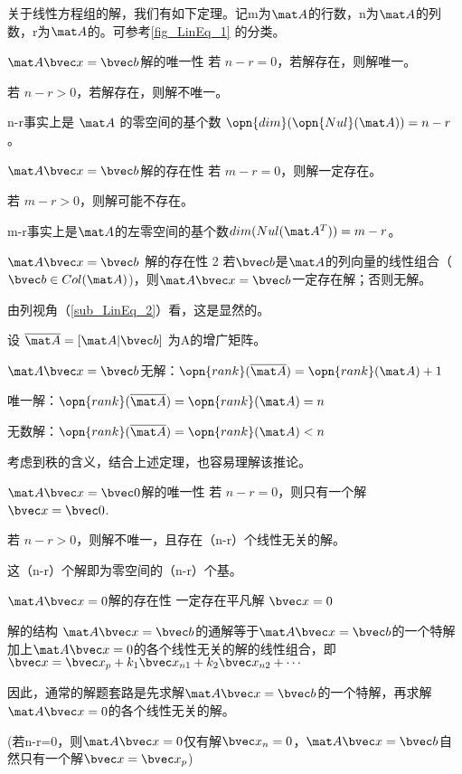 

关于线性方程组的解，我们有如下定理。记m为$\mat A$的行数，n为$\mat A$的列数，r为$\mat A$的。可参考\autoref{fig_LinEq_1} 的分类。

\begin{theorem}{$\mat A \bvec x=\bvec b$解的唯一性}
若 $n-r=0$，若解存在，则解唯一。

若 $n-r>0$，若解存在，则解不唯一。
\end{theorem}
n-r事实上是 $\mat A$ 的零空间的基个数 $\opn{dim}(\opn{Nul}(\mat A))=n-r$。

\begin{theorem}{$\mat A \bvec x=\bvec b$解的存在性}
若 $m-r=0$，则解一定存在。

若 $m-r>0$，则解可能不存在。
\end{theorem}
m-r事实上是$\mat A$的左零空间的基个数$dim(Nul(\mat A^T))=m-r$。

\begin{theorem}{$\mat A \bvec x=\bvec b$ 解的存在性 2}
若$\bvec b$是$\mat A$的列向量的线性组合（$\bvec b \in Col(\mat A)$)，则$\mat A \bvec x=\bvec b$一定存在解；否则无解。
\end{theorem}
由列视角（\autoref{sub_LinEq_2}）看，这是显然的。

\begin{corollary}{}
设 $\overline{\mat A} = [\mat A | \bvec b] $ 为A的增广矩阵。

$\mat A \bvec x=\bvec b$无解：$\opn{rank}(\overline{\mat A})=\opn{rank}(\mat A)+1$

唯一解：$\opn{rank}(\overline{\mat A})=\opn{rank}(\mat A)=n$

无数解：$\opn{rank}(\overline{\mat A})=\opn{rank}(\mat A)<n$
\end{corollary}
考虑到秩的含义，结合上述定理，也容易理解该推论。

\begin{theorem}{$\mat A \bvec x=\bvec 0$解的唯一性}
若 $n-r=0$，则只有一个解 $\bvec x = \bvec 0$.

若 $n-r>0$，则解不唯一，且存在（n-r）个线性无关的解。
\end{theorem}
这（n-r）个解即为零空间的（n-r）个基。

\begin{theorem}{$\mat A \bvec x=0$解的存在性}
一定存在平凡解 $\bvec x=0$
\end{theorem}

\begin{theorem}{解的结构}
$\mat A \bvec x=\bvec b$的通解等于$\mat A \bvec x=\bvec b$的一个特解加上$\mat A \bvec x=0$的各个线性无关的解的线性组合，即$\bvec x = \bvec x_p +k_1\bvec x_{n1}+k_2\bvec x_{n2}+\cdots$

因此，通常的解题套路是先求解$\mat A \bvec x=\bvec b$的一个特解，再求解$\mat A \bvec x=0$的各个线性无关的解。

(若n-r=0，则$\mat A \bvec x=0$仅有解$\bvec x_n=0$，$\mat A \bvec x=\bvec b$自然只有一个解$\bvec x = \bvec x_p$)
\end{theorem}

